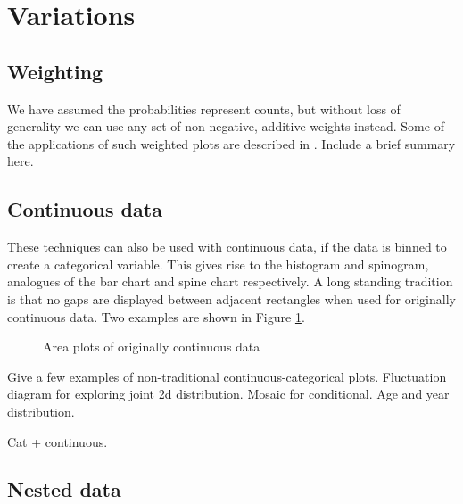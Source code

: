 \documentclass[letterpaper,oneside]{scrartcl}
\begin{document}


\section{Variations}
\label{sec:variations}

% 


\subsection{Weighting}
\label{sub:weighting}

We have assumed the probabilities represent counts, but without loss of generality we can use any set of non-negative, additive weights instead.  Some of the applications of such weighted plots are described in \citet{unwin:2007}.  Include a brief summary here.

\subsection{Continuous data}
\label{sub:continuous_data}

These techniques can also be used with continuous data, if the data is binned to create a categorical variable. This gives rise to the histogram and spinogram, analogues of the bar chart and spine chart respectively. A long standing tradition is that no gaps are displayed between adjacent rectangles when used for originally continuous data. Two examples are shown in Figure \ref{fig:cont-examples}.

\begin{figure}[htbp]
  \begin{center}
  \end{center}
  \caption{Area plots of originally continuous data}
  \label{fig:cont-examples}
\end{figure}

Give a few examples of non-traditional continuous-categorical plots.  Fluctuation diagram for exploring joint 2d distribution.  Mosaic for conditional.  Age and year distribution.  

Cat + continuous.

\subsection{Nested data}
\label{sub:nested_data}
\end{document}
